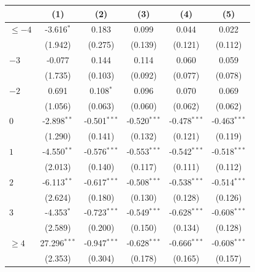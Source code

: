
\begingroup
\centering
\begin{tabular}{lccccc}
   \toprule
                        & (1)             & (2)            & (3)            & (4)            & (5)\\  
   \midrule 
   $\leq -4$            & -3.616$^{*}$    & 0.183          & 0.099          & 0.044          & 0.022\\   
                        & (1.942)         & (0.275)        & (0.139)        & (0.121)        & (0.112)\\   
   $-3$                 & -0.077          & 0.144          & 0.114          & 0.060          & 0.059\\   
                        & (1.735)         & (0.103)        & (0.092)        & (0.077)        & (0.078)\\   
   $-2$                 & 0.691           & 0.108$^{*}$    & 0.096          & 0.070          & 0.069\\   
                        & (1.056)         & (0.063)        & (0.060)        & (0.062)        & (0.062)\\   
   $0$                  & -2.898$^{**}$   & -0.501$^{***}$ & -0.520$^{***}$ & -0.478$^{***}$ & -0.463$^{***}$\\   
                        & (1.290)         & (0.141)        & (0.132)        & (0.121)        & (0.119)\\   
   $1$                  & -4.550$^{**}$   & -0.576$^{***}$ & -0.553$^{***}$ & -0.542$^{***}$ & -0.518$^{***}$\\   
                        & (2.013)         & (0.140)        & (0.117)        & (0.111)        & (0.112)\\   
   $2$                  & -6.113$^{**}$   & -0.617$^{***}$ & -0.508$^{***}$ & -0.538$^{***}$ & -0.514$^{***}$\\   
                        & (2.624)         & (0.180)        & (0.130)        & (0.128)        & (0.126)\\   
   $3$                  & -4.353$^{*}$    & -0.723$^{***}$ & -0.549$^{***}$ & -0.628$^{***}$ & -0.608$^{***}$\\   
                        & (2.589)         & (0.200)        & (0.150)        & (0.134)        & (0.128)\\   
   $\geq 4$             & 27.296$^{***}$  & -0.947$^{***}$ & -0.628$^{***}$ & -0.666$^{***}$ & -0.608$^{***}$\\   
                        & (2.353)         & (0.304)        & (0.178)        & (0.165)        & (0.157)\\   

\end{tabular}
